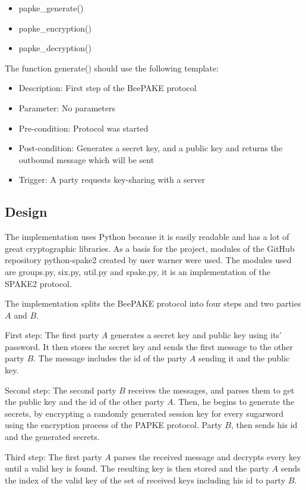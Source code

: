 \documentclass[../main.tex]{subfiles}
\begin{document}
\begin{itemize}
	\item papke\_generate()
	\item papke\_encryption()
	\item papke\_decryption()
\end{itemize}

The function generate() should use the following template:
\begin{itemize}
	\item Description: First step of the BeePAKE protocol
	\item Parameter: No parameters
	\item Pre-condition: Protocol was started
	\item Post-condition: Generates a secret key, and a public key and returns the outbound message which will be sent
	\item Trigger: A party requests key-sharing with a server
\end{itemize}

\subsection{Design} 
The implementation uses Python because it is easily readable and has a lot of great
cryptographic libraries. As a basis for the project, modules of the GitHub
repository python-spake2 created by user warner \cite{warner2016} were used. The
modules used are groups.py, six.py, util.py and spake.py, it is an
implementation of the SPAKE2 protocol. 

The implementation splits the BeePAKE protocol into four steps and two parties
\(A\) and \(B\).

First step: The first party \(A\) generates a secret key and public key using its'
password. It then stores the secret key and sends the first message to the
other party \(B\). The message includes the id of the party \(A\) sending it and the public
key.

Second step: The second party \(B\) receives the messages, and parses them to get the
public key and the id of the other party \(A\). Then, he begins to generate the
secrets, by encrypting a randomly generated session key for every sugarword using
the encryption process of the PAPKE protocol. Party \(B\), then sends his id
and the generated secrets.

Third step: The first party \(A\) parses the received message and decrypts
every key until a valid key is found. The resulting key is then stored and the party
\(A\) sends the index of the valid key of the set of received keys including
his id to party \(B\). 
\end{document}

